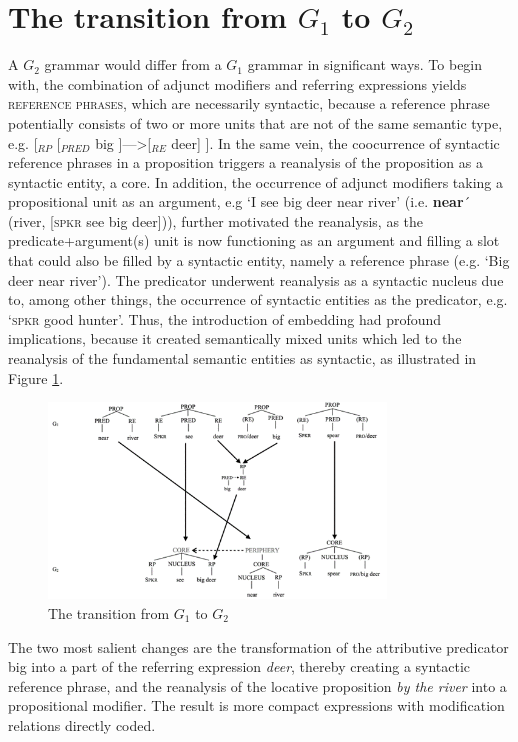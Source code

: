 \documentclass[output=paper,colorlinks,citecolor=brown]{langscibook}
\begin{document}
\section{The transition from $G_1$ to $G_2$}\label{sec:vanvalin:5}

A $G_2$ grammar would differ from a $G_1$ grammar in significant ways.  To begin with, the combination of adjunct modifiers and referring expressions yields \textsc{reference phrases}, which are necessarily syntactic, because a reference phrase potentially consists of two or more units that are not of the same semantic type, e.g. [$_{RP}$ [$_{PRED}$ big ]—>[$_{RE}$ deer] ].  In the same vein, the coocurrence of syntactic reference phrases in a proposition triggers a reanalysis of the proposition as a syntactic entity, a core.  In addition, the occurrence of adjunct modifiers taking a propositional unit as an argument, e.g ‘I see big deer near river’ (i.e. \textbf{near}´ (river, [\textsc{spkr} see big deer])), further motivated the reanalysis, as the predicate+argument(s) unit is now functioning as an argument and filling a slot that could also be filled by a syntactic entity, namely a reference phrase (e.g. ‘Big deer near river’).  The predicator underwent reanalysis as a syntactic nucleus due to, among other things, the occurrence of syntactic entities as the predicator, e.g. ‘\textsc{spkr} good hunter’.  Thus, the introduction of embedding had profound implications, because it created semantically mixed units which led to the reanalysis of the fundamental semantic entities as syntactic, as illustrated in Figure \ref{fig:fig3}.

\begin{figure}
\centering
\includegraphics[width=0.8\textwidth]{vanvalin_figure3.png}
\caption{\label{fig:fig3}The transition from $G_1$ to $G_2$}
\end{figure}

The two most salient changes are the transformation of the attributive predicator big into a part of the referring expression \emph{deer}, thereby creating a syntactic reference phrase, and the reanalysis of the locative proposition \emph{by the river} into a propositional modifier.  The result is more compact expressions with modification relations directly coded.  
\end{document}
